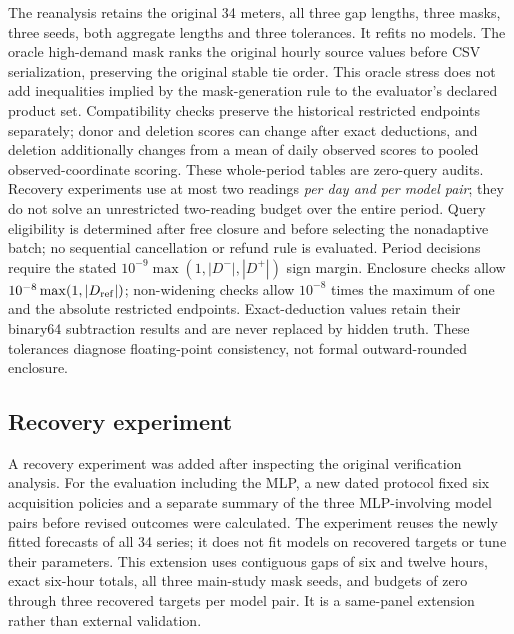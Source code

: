 \documentclass[12pt]{article}
\begin{document}
The reanalysis retains the original 34 meters, all three gap lengths,
three masks, three seeds, both aggregate lengths and three tolerances.
It refits no models. The oracle high-demand mask ranks the original hourly
source values before CSV serialization, preserving the original stable
tie order. This oracle stress does not add inequalities implied by the
mask-generation rule to the evaluator's declared product set.
Compatibility checks preserve the historical
restricted endpoints separately; donor and deletion scores can change after
exact deductions, and deletion additionally changes from a mean of daily
observed scores to pooled observed-coordinate scoring.
These whole-period tables are zero-query audits. Recovery experiments use
at most two readings \emph{per day and per model pair}; they do not solve
an unrestricted two-reading budget over the entire period.
Query eligibility is determined after free closure and before selecting the
nonadaptive batch; no sequential cancellation or refund rule is evaluated.
Period decisions require the stated $10^{-9}\max(1,|D^-|,|D^+|)$
sign margin. Enclosure checks allow $10^{-8}\max(1,|D_{\rm ref}|)$;
non-widening checks allow $10^{-8}$ times the maximum of one and the
absolute restricted endpoints. Exact-deduction values retain their
binary64 subtraction results and are never replaced by hidden truth.
These tolerances diagnose floating-point consistency, not formal
outward-rounded enclosure.


\subsection{Recovery experiment}
A recovery experiment was added after inspecting the original verification
analysis. For the evaluation including the MLP, a new dated protocol fixed six
acquisition policies and a separate summary of the three MLP-involving
model pairs before revised outcomes were calculated. The experiment reuses
the newly fitted forecasts of all 34 series; it does not fit models on
recovered targets or tune their parameters.
This extension uses contiguous gaps of six and twelve hours, exact six-hour
totals, all three main-study mask seeds, and budgets of zero through three
recovered targets per model pair. It is a same-panel extension rather than
external validation.
\end{document}

